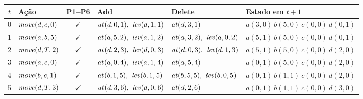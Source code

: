 \begin{longtable}{c p{2.6cm} c p{3.4cm} p{3.4cm} p{3.6cm}}
\toprule $t$ & Ação & P1--P6 & Add & Delete & Estado em $t+1$ \\ \midrule \endhead
0 & $\mathit{move}(d,c,0)$ & $\checkmark$ & $\At(d,0,1),\ \Lev(d,1,1)$ & $\mathit{at}(d,3,1)$ & $a(3,0)\ b(5,0)\ c(0,0)\ d(0,1)$ \\
1 & $\mathit{move}(a,b,5)$ & $\checkmark$ & $\At(a,5,2),\ \Lev(a,1,2)$ & $\At(a,3,2),\ \Lev(a,0,2)$ & $a(5,1)\ b(5,0)\ c(0,0)\ d(0,1)$ \\
2 & $\mathit{move}(d,T,2)$ & $\checkmark$ & $\At(d,2,3),\ \Lev(d,0,3)$ & $\At(d,0,3),\ \Lev(d,1,3)$ & $a(5,1)\ b(5,0)\ c(0,0)\ d(2,0)$ \\
3 & $\mathit{move}(a,c,0)$ & $\checkmark$ & $\At(a,0,4),\ \Lev(a,1,4)$ & $\mathit{at}(a,5,4)$ & $a(0,1)\ b(5,0)\ c(0,0)\ d(2,0)$ \\
4 & $\mathit{move}(b,c,1)$ & $\checkmark$ & $\At(b,1,5),\ \Lev(b,1,5)$ & $\At(b,5,5),\ \Lev(b,0,5)$ & $a(0,1)\ b(1,1)\ c(0,0)\ d(2,0)$ \\
5 & $\mathit{move}(d,T,3)$ & $\checkmark$ & $\At(d,3,6),\ \Lev(d,0,6)$ & $\mathit{at}(d,2,6)$ & $a(0,1)\ b(1,1)\ c(0,0)\ d(3,0)$ \\
\bottomrule \end{longtable}
